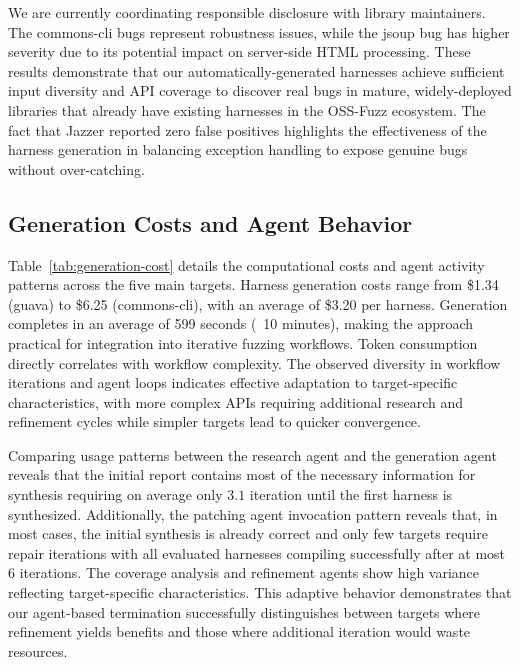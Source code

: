 We are currently coordinating responsible disclosure with library maintainers. The commons-cli bugs represent robustness issues, while the jsoup bug has higher severity due to its potential impact on server-side HTML processing.
These results demonstrate that our automatically-generated harnesses achieve sufficient input diversity and API coverage to discover real bugs in mature, widely-deployed libraries that already have existing harnesses in the OSS-Fuzz ecosystem. The fact that Jazzer reported zero false positives highlights the effectiveness of the harness generation in balancing exception handling to expose genuine bugs without over-catching.
%
\subsection{Generation Costs and Agent Behavior}%
\label{subsec:generation-costs}
%

%
Table~\ref{tab:generation-cost} details the computational costs and agent activity patterns across the five main targets. Harness generation costs range from \$1.34 (guava) to \$6.25 (commons-cli), with an average of \$3.20 per harness. Generation completes in an average of 599 seconds (~10 minutes), making the approach practical for integration into iterative fuzzing workflows.
Token consumption directly correlates with workflow complexity. The observed diversity in workflow iterations and agent loops indicates effective adaptation to target-specific characteristics, with more complex APIs requiring additional research and refinement cycles while simpler targets lead to quicker convergence. 
\par
Comparing usage patterns between the research agent and the generation agent reveals that the initial report contains most of the necessary information for synthesis requiring on average only $3.1$ iteration until the first harness is synthesized. Additionally, the patching agent invocation pattern reveals that, in most cases, the initial synthesis is already correct and only few targets require repair iterations with all evaluated harnesses compiling successfully after at most $6$ iterations.
The coverage analysis and refinement agents show high variance reflecting target-specific characteristics.
This adaptive behavior demonstrates that our agent-based termination successfully distinguishes between targets where refinement yields benefits and those where additional iteration would waste resources.




